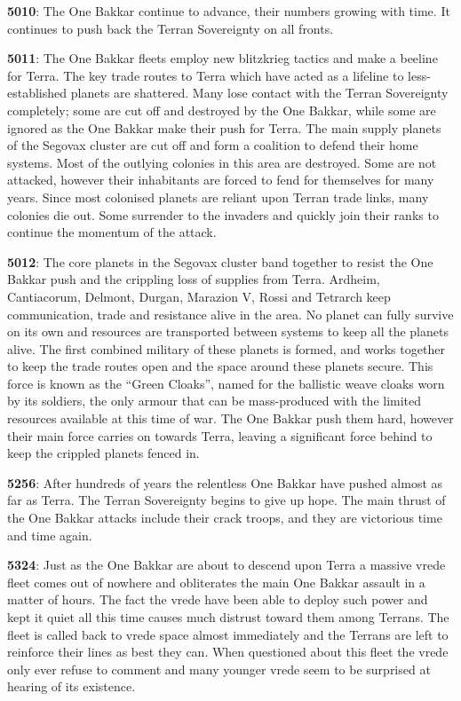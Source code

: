 \documentclass{scrbook}
\begin{document}
\textbf{5010}: The One Bakkar continue to advance, their numbers growing with time. It continues to push back the Terran Sovereignty on all fronts.

\textbf{5011}: The One Bakkar fleets employ new blitzkrieg tactics and make a beeline for Terra. The key trade routes to Terra which have acted as a lifeline to less-established planets are shattered. Many lose contact with the Terran Sovereignty completely; some are cut off and destroyed by the One Bakkar, while some are ignored as the One Bakkar make their push for Terra. The main supply planets of the Segovax cluster are cut off and form a coalition to defend their home systems. Most of the outlying colonies in this area are destroyed. Some are not attacked, however their inhabitants are forced to fend for themselves for many years. Since most colonised planets are reliant upon Terran trade links, many colonies die out. Some surrender to the invaders and quickly join their ranks to continue the momentum of the attack.

\textbf{5012}: The core planets in the Segovax cluster band together to resist the One Bakkar push and the crippling loss of supplies from Terra. Ardheim, Cantiacorum, Delmont, Durgan, Marazion V, Rossi and Tetrarch keep communication, trade and resistance alive in the area. No planet can fully survive on its own and resources are transported between systems to keep all the planets alive. The first combined military of these planets is formed, and works together to keep the trade routes open and the space around these planets secure. This force is known as the ``Green Cloaks'', named for the ballistic weave cloaks worn by its soldiers, the only armour that can be mass-produced with the limited resources available at this time of war. The One Bakkar push them hard, however their main force carries on towards Terra, leaving a significant force behind to keep the crippled planets fenced in.

\textbf{5256}: After hundreds of years the relentless One Bakkar have pushed almost as far as Terra. The Terran Sovereignty begins to give up hope. The main thrust of the One Bakkar attacks include their crack troops, and they are victorious time and time again.

\textbf{5324}: Just as the One Bakkar are about to descend upon Terra a massive vrede fleet comes out of nowhere and obliterates the main One Bakkar assault in a matter of hours. The fact the vrede have been able to deploy such power and kept it quiet all this time causes much distrust toward them among Terrans. The fleet is called back to vrede space almost immediately and the Terrans are left to reinforce their lines as best they can. When questioned about this fleet the vrede only ever refuse to comment and many younger vrede seem to be surprised at hearing of its existence.
\end{document}
